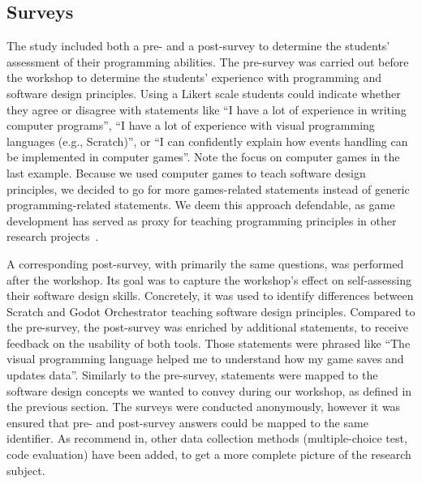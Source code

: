 \subsection{Surveys}\label{subsec:surveys}
The study included both a pre- and a post-survey to determine the students' assessment of their programming abilities.
The pre-survey was carried out before the workshop to determine the students' experience with programming and software design principles.
Using a Likert scale students could indicate whether they agree or disagree with statements like “I have a lot of experience in writing computer programs”, “I have a lot of experience with visual programming languages (e.g., Scratch)”, or “I can confidently explain how events handling can be implemented in computer games”.
Note the focus on computer games in the last example.
Because we used computer games to teach software design principles, we decided to go for more games-related statements instead of generic programming-related statements.
We deem this approach defendable, as game development has served as proxy for teaching programming principles in other research projects~\cite{mathrani_playit_2016,papadakis_evaluating_2020}.

A corresponding post-survey, with primarily the same questions, was performed after the workshop.
Its goal was to capture the workshop's effect on self-assessing their software design skills.
Concretely, it was used to identify differences between Scratch and Godot Orchestrator teaching software design principles.
Compared to the pre-survey, the post-survey was enriched by additional statements, to receive feedback on the usability of both tools.
Those statements were phrased like “The visual programming language helped me to understand how my game saves and updates data”.
Similarly to the pre-survey, statements were mapped to the software design concepts we wanted to convey during our workshop, as defined
in the previous section.
The surveys were conducted anonymously, however it was ensured that pre- and post-survey answers could be mapped
to the same identifier.
As recommend in\cite{nemoto_developing_2013}, other data collection methods (multiple-choice test, code evaluation)
have been added, to get a more complete picture of the research subject.

